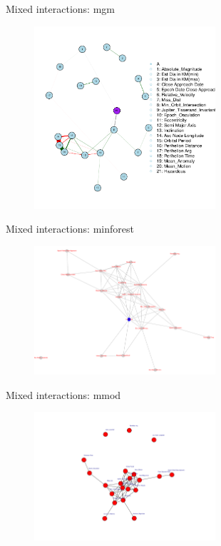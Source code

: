 \documentclass{beamer}
\begin{document}
\begin{frame}{Mixed interactions: mgm}
\begin{figure}[h]
\begin{center}
\includegraphics[width=0.6\textwidth]{Pic/mgm.pdf}
\label{mgm}
\end{center}
\end{figure}
\end{frame}

\begin{frame}{Mixed interactions: minforest}
\begin{figure}[h]
\begin{center}
\includegraphics[width=0.6\textwidth]{Pic/minforest.pdf}
\label{mgm}
\end{center}
\end{figure}
\end{frame}

\begin{frame}{Mixed interactions: mmod}
\begin{figure}[h]
\begin{center}
\includegraphics[width=0.6\textwidth]{Pic/mmod.pdf}
\label{mgm}
\end{center}
\end{figure}
\end{frame}
\end{document}
